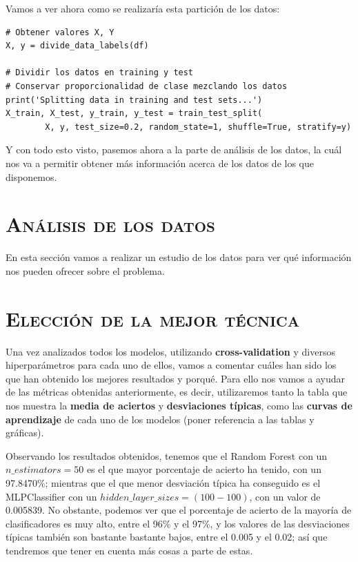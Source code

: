 \documentclass[11pt,a4paper]{article}
\begin{document}
Vamos a ver ahora como se realizaría esta partición de los datos:

\begin{lstlisting}
# Obtener valores X, Y
X, y = divide_data_labels(df)

# Dividir los datos en training y test
# Conservar proporcionalidad de clase mezclando los datos
print('Splitting data in training and test sets...')
X_train, X_test, y_train, y_test = train_test_split(
        X, y, test_size=0.2, random_state=1, shuffle=True, stratify=y)
\end{lstlisting}

Y con todo esto visto, pasemos ahora a la parte de análisis de los datos, la cuál nos va a permitir obtener más información acerca de
los datos de los que disponemos.

\newpage

\section{\textsc{Análisis de los datos}}

En esta sección vamos a realizar un estudio de los datos para ver qué información nos pueden ofrecer sobre el problema.


\newpage

\section{\textsc{Elección de la mejor técnica}}

Una vez analizados todos los modelos, utilizando \textbf{cross-validation} y diversos hiperparámetros para cada uno de ellos, vamos a comentar cuáles han sido los que han obtenido los mejores resultados y porqué. Para ello nos vamos a ayudar de las métricas obtenidas anteriormente, es decir, utilizaremos tanto la tabla que nos muestra la \textbf{media de aciertos} y \textbf{desviaciones típicas}, como las \textbf{curvas de aprendizaje} de cada uno de los modelos (poner referencia a las tablas y gráficas).

Observando los resultados obtenidos, tenemos que el Random Forest con un $n\_estimators = 50$ es el que mayor porcentaje de acierto ha tenido, con un 97.8470\%; mientras que el que menor desviación típica ha conseguido es el MLPClassifier con un $hidden\_layer\_sizes = (100-100)$, con un valor de 0.005839. No obstante, podemos ver que el porcentaje de acierto de la mayoría de clasificadores es muy alto, entre el 96\% y el 97\%, y los valores de las desviaciones típicas también son bastante bastante bajos, entre el 0.005 y el 0.02; así que tendremos que tener en cuenta más cosas a parte de estas.
\end{document}
